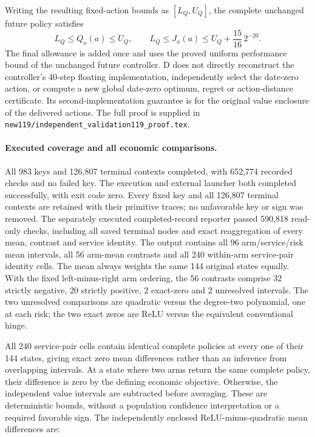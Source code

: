 Writing the resulting fixed-action bounds as $[L_Q,U_Q]$, the complete
unchanged future policy satisfies
\[
 L_Q\le Q_x(a)\le U_Q,
 \qquad L_Q\le J_x(a)\le U_Q+\frac{15}{16}\,2^{-20}.
\]
The final allowance is added once and uses the proved uniform performance
bound of the unchanged future controller. D does not directly reconstruct
the controller's 40-step floating implementation, independently select the
date-zero action, or compute a new global date-zero optimum, regret or
action-distance certificate. Its second-implementation guarantee is for the
original value enclosure of the delivered actions. The full proof is supplied
in \nolinkurl{new119/independent_validation119_proof.tex}.

\paragraph{Executed coverage and all economic comparisons.}
All 983 keys and 126,807 terminal contexts completed, with 652,774 recorded checks and no failed key. The execution and external launcher both completed successfully,
with exit code zero. Every fixed key and all 126,807 terminal contexts are
retained with their primitive traces; no unfavorable key or sign was removed.
The separately executed completed-record reporter passed 590,818 read-only
checks, including all saved terminal nodes and exact reaggregation of every
mean, contrast and service identity.
The output contains all 96 arm/service/risk mean intervals, all 56 arm-mean
contrasts and all 240 within-arm service-pair identity cells. The mean always
weights the same 144 original states equally. With the fixed left-minus-right arm ordering, the 56 contrasts comprise 32 strictly negative, 20 strictly positive, 2 exact-zero and 2 unresolved intervals. The two unresolved comparisons are quadratic versus the degree-two polynomial, one at each risk; the two exact zeros are ReLU versus the equivalent conventional hinge.

All 240 service-pair cells contain identical complete policies at every one of their 144 states, giving exact zero mean differences rather than an inference from overlapping intervals. At a state where two arms return the same complete policy, their
difference is zero by the defining economic objective. Otherwise, the
independent value intervals are subtracted before averaging. These are
deterministic bounds, without a population confidence interpretation or a
required favorable sign. The independently enclosed ReLU-minus-quadratic
mean differences are:

